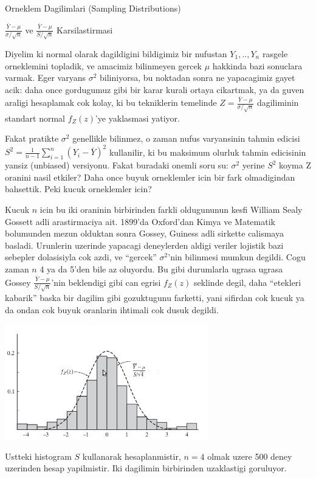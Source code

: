 \documentclass[12pt,fleqn]{article}\usepackage{../common}
\begin{document}
Orneklem Dagilimlari (Sampling Distributions)

$\frac{\bar{Y}-\mu}{\sigma / \sqrt{n}}$ ve $\frac{\bar{Y}-\mu}{S /
  \sqrt{n}}$ Karsilastirmasi

Diyelim ki normal olarak dagildigini bildigimiz bir nufustan $Y_1,..,Y_n$
rasgele orneklemini topladik, ve amacimiz bilinmeyen gercek $\mu$ hakkinda
bazi sonuclara varmak. Eger varyans $\sigma^2$ biliniyorsa, bu noktadan
sonra ne yapacagimiz gayet acik: daha once gordugumuz gibi bir karar kurali
ortaya cikartmak, ya da guven araligi hesaplamak cok kolay, ki bu
tekniklerin temelinde $Z = \frac{\bar{Y}-\mu}{\sigma / \sqrt{n}}$ dagiliminin standart normal $f_Z(z)$'ye 
yaklasmasi yatiyor. 

Fakat pratikte $\sigma^2$ genellikle bilinmez, o zaman nufus varyansinin
tahmin edicisi $S^2 = \frac{1}{n-1}\sum_{i=1}^n (Y_i-\bar{Y})^2$
kullanilir, ki bu maksimum olurluk tahmin edicisinin yansiz (unbiased)
versiyonu. Fakat buradaki onemli soru su: $\sigma^2$ yerine $S^2$ koyma Z
oranini nasil etkiler? Daha once buyuk orneklemler icin bir fark
olmadigindan bahsettik. Peki kucuk orneklemler icin? 

Kucuk $n$ icin bu iki oraninin birbirinden farkli oldugununun kesfi William
Sealy Gossett adli arastirmaciya ait. 1899'da Oxford'dan Kimya ve Matematik
bolumunden mezun olduktan sonra Gossey, Guiness adli sirkette calismaya
basladi. Urunlerin uzerinde yapacagi deneylerden aldigi veriler lojistik
bazi sebepler dolasisiyla cok azdi, ve ``gercek'' $\sigma^2$'nin bilinmesi
mumkun degildi. Cogu zaman $n$ 4 ya da 5'den bile az oluyordu. Bu gibi
durumlarla ugrasa ugrasa Gossey $\frac{\bar{Y}-\mu}{S / \sqrt{n}}$'nin
beklendigi gibi can egrisi $f_Z(z)$ seklinde degil, daha ``etekleri
kabarik'' baska bir dagilim gibi gozuktugunu farketti, yani sifirdan cok
kucuk ya da ondan cok buyuk oranlarin ihtimali cok dusuk degildi. 
 
\includegraphics[height=5cm]{t1.png}

Ustteki histogram $S$ kullanarak hesaplanmistir, $n=4$ olmak uzere 500
deney uzerinden hesap yapilmistir. Iki dagilimin birbirinden uzaklastigi
goruluyor. 
\end{document}
